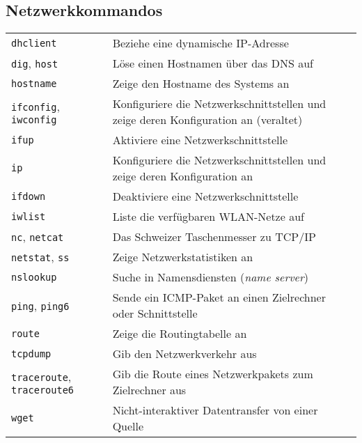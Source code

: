 \documentclass[10pt,a4paper]{article}
\begin{document}
\begin{multicols}{2}

\section{Netzwerkkommandos}
\begin{tabular}{ p{2.5cm} p{8.5cm} }
  \hline
  \texttt{dhclient} & Beziehe eine dynamische IP-Adresse \\
  \rowcolor{Gray}
  \texttt{dig}, \texttt{host} & Löse einen Hostnamen über das DNS auf \\
  \texttt{hostname} & Zeige den Hostname des Systems an \\
  \rowcolor{Gray}
  \texttt{ifconfig}, \texttt{iwconfig} & Konfiguriere die Netzwerkschnittstellen und zeige deren Konfiguration an (veraltet)\\
  \texttt{ifup} & Aktiviere eine Netzwerkschnittstelle\\
  \rowcolor{Gray}
  \texttt{ip} & Konfiguriere die Netzwerkschnittstellen und zeige deren Konfiguration an \\
  \texttt{ifdown} & Deaktiviere eine Netzwerkschnittstelle \\
  \rowcolor{Gray}
  \texttt{iwlist} & Liste die verfügbaren WLAN-Netze auf\\
  \texttt{nc}, \texttt{netcat} & Das Schweizer Taschenmesser zu TCP/IP \\
  \rowcolor{Gray}
  \texttt{netstat}, \texttt{ss} & Zeige Netzwerkstatistiken an \\
  \texttt{nslookup} & Suche in Namensdiensten (\textit{name server}) \\
  \rowcolor{Gray}
  \texttt{ping}, \texttt{ping6} & Sende ein ICMP-Paket an einen Zielrechner oder Schnittstelle \\
  \texttt{route} & Zeige die Routingtabelle an \\
  \rowcolor{Gray}
  \texttt{tcpdump} & Gib den Netzwerkverkehr aus \\
  \texttt{traceroute}, \texttt{traceroute6} & Gib die Route eines Netzwerkpakets zum Zielrechner aus \\
  \rowcolor{Gray}
  \texttt{wget} & Nicht-interaktiver Datentransfer von einer Quelle\\
  \hline
\end{tabular}

\hfill


\end{multicols}
\end{document}
